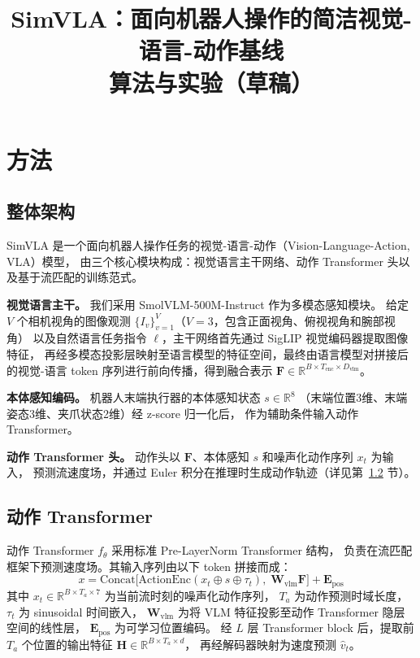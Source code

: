 \documentclass[10pt,twocolumn]{article}
\title{SimVLA：面向机器人操作的简洁视觉-语言-动作基线\\
\large 算法与实验（草稿）}
\author{}
\date{}
\begin{document}
\maketitle

\section{方法}

\subsection{整体架构}

SimVLA 是一个面向机器人操作任务的视觉-语言-动作（Vision-Language-Action, VLA）模型，
由三个核心模块构成：视觉语言主干网络、动作 Transformer 头以及基于流匹配的训练范式。

\noindent\textbf{视觉语言主干。}
我们采用 SmolVLM-500M-Instruct 作为多模态感知模块。
给定 $V$ 个相机视角的图像观测 $\{I_v\}_{v=1}^{V}$（$V{=}3$，包含正面视角、俯视视角和腕部视角）
以及自然语言任务指令 $\ell$，主干网络首先通过 SigLIP 视觉编码器提取图像特征，
再经多模态投影层映射至语言模型的特征空间，最终由语言模型对拼接后的视觉-语言
token 序列进行前向传播，得到融合表示
$\mathbf{F} \in \mathbb{R}^{B \times T_{\mathrm{enc}} \times D_{\mathrm{vlm}}}$。

\noindent\textbf{本体感知编码。}
机器人末端执行器的本体感知状态 $s \in \mathbb{R}^{8}$
（末端位置3维、末端姿态3维、夹爪状态2维）经 z-score 归一化后，
作为辅助条件输入动作 Transformer。

\noindent\textbf{动作 Transformer 头。}
动作头以 $\mathbf{F}$、本体感知 $s$ 和噪声化动作序列 $x_t$ 为输入，
预测流速度场，并通过 Euler 积分在推理时生成动作轨迹（详见第~\ref{sec:transformer} 节）。

\subsection{动作 Transformer}
\label{sec:transformer}

动作 Transformer $f_\theta$ 采用标准 Pre-LayerNorm Transformer 结构，
负责在流匹配框架下预测速度场。其输入序列由以下 token 拼接而成：
\begin{equation}
  x = \mathrm{Concat}\!\bigl[
    \mathrm{ActionEnc}(x_t \oplus s \oplus \tau_t),\;
    \mathbf{W}_{\mathrm{vlm}}\mathbf{F}
  \bigr] + \mathbf{E}_{\mathrm{pos}}
\end{equation}
其中 $x_t \in \mathbb{R}^{B \times T_a \times 7}$ 为当前流时刻的噪声化动作序列，
$T_a$ 为动作预测时域长度，$\tau_t$ 为 sinusoidal 时间嵌入，
$\mathbf{W}_{\mathrm{vlm}}$ 为将 VLM 特征投影至动作 Transformer 隐层空间的线性层，
$\mathbf{E}_{\mathrm{pos}}$ 为可学习位置编码。
经 $L$ 层 Transformer block 后，提取前 $T_a$ 个位置的输出特征
$\mathbf{H} \in \mathbb{R}^{B \times T_a \times d}$，
再经解码器映射为速度预测 $\hat{v}_t$。
\end{document}
